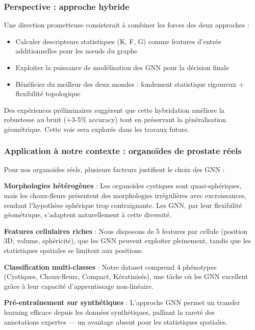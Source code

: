 \subsubsection{Perspective : approche hybride}

Une direction prometteuse consisterait à combiner les forces des deux approches :
\begin{itemize}
    \item Calculer descripteurs statistiques (K, F, G) comme features d'entrée additionnelles pour les nœuds du graphe
    \item Exploiter la puissance de modélisation des GNN pour la décision finale
    \item Bénéficier du meilleur des deux mondes : fondement statistique rigoureux + flexibilité topologique
\end{itemize}

Des expériences préliminaires suggèrent que cette hybridation améliore la robustesse au bruit (+3-5\% accuracy) tout en préservant la généralisation géométrique. Cette voie sera explorée dans les travaux futurs.

\subsubsection{Application à notre contexte : organoïdes de prostate réels}

Pour nos organoïdes réels, plusieurs facteurs justifient le choix des GNN :

\textbf{Morphologies hétérogènes} : Les organoïdes cystiques sont quasi-sphériques, mais les choux-fleurs présentent des morphologies irrégulières avec excroissances, rendant l'hypothèse sphérique trop contraignante. Les GNN, par leur flexibilité géométrique, s'adaptent naturellement à cette diversité.

\textbf{Features cellulaires riches} : Nous disposons de 5 features par cellule (position 3D, volume, sphéricité), que les GNN peuvent exploiter pleinement, tandis que les statistiques spatiales se limitent aux positions.

\textbf{Classification multi-classes} : Notre dataset comprend 4 phénotypes (Cystiques, Choux-fleurs, Compact, Kératinisés), une tâche où les GNN excellent grâce à leur capacité d'apprentissage non-linéaire.

\textbf{Pré-entraînement sur synthétiques} : L'approche GNN permet un transfer learning efficace depuis les données synthétiques, palliant la rareté des annotations expertes — un avantage absent pour les statistiques spatiales.

